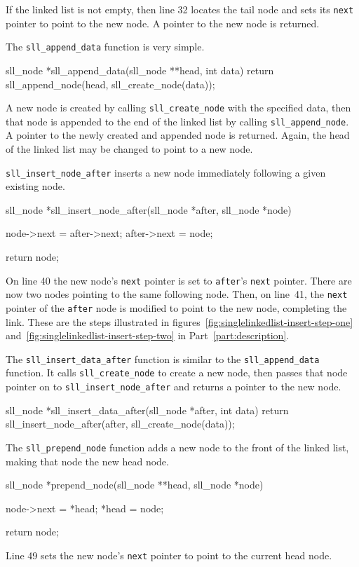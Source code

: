 \documentclass{article}
\begin{document}
  If the linked list is not empty, then line 32 locates the tail node and sets its \verb|next| pointer to point to the new node. A pointer to the new node is returned.

  The \verb|sll_append_data| function is very simple.
  \begin{lstc}
sll_node *sll_append_data(sll_node **head, int data) {
  return sll_append_node(head, sll_create_node(data));
}\end{lstc}
  A new node is created by calling \verb|sll_create_node| with the specified data, then that node is appended to the end of the linked list by calling \verb|sll_append_node|. A pointer to the newly created and appended node is returned. Again, the head of the linked list may be changed to point to a new node.

  \verb|sll_insert_node_after| inserts a new node immediately following a given existing node.
  \begin{lstc}
sll_node *sll_insert_node_after(sll_node *after, sll_node *node) {
  node->next = after->next;
  after->next = node;

  return node;
}\end{lstc}
  On line 40 the new node's \verb|next| pointer is set to \verb|after|'s \verb|next| pointer. There are now two nodes pointing to the same following node. Then, on line~41, the \verb|next| pointer of the \verb|after| node is modified to point to the new node, completing the link. These are the steps illustrated in figures~\ref{fig:singlelinkedlist-insert-step-one} and~\ref{fig:singlelinkedlist-insert-step-two} in Part~\ref{part:description}.

  The \verb|sll_insert_data_after| function is similar to the \verb|sll_append_data| function. It calls \verb|sll_create_node| to create a new node, then passes that node pointer on to \verb|sll_insert_node_after| and returns a pointer to the new node.
  \begin{lstc}
sll_node *sll_insert_data_after(sll_node *after, int data) {
  return sll_insert_node_after(after, sll_create_node(data));
}\end{lstc}

  The \verb|sll_prepend_node| function adds a new node to the front of the linked list, making that node the new head node.
  \begin{lstc}
sll_node *prepend_node(sll_node **head, sll_node *node) {
  node->next = *head;
  *head = node;

  return node;
}\end{lstc}
  Line 49 sets the new node's \verb|next| pointer to point to the current head node.
\end{document}
